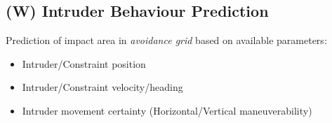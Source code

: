 \subsection{(W) Intruder Behaviour Prediction}\label{s:intruderBehaviourPrediction}
    \noindent Prediction of impact area in \emph{avoidance grid} based on available parameters:
    \begin{itemize}
        \item Intruder/Constraint position
        \item Intruder/Constraint velocity/heading
        \item Intruder movement certainty (Horizontal/Vertical maneuverability)
    \end{itemize}
    
